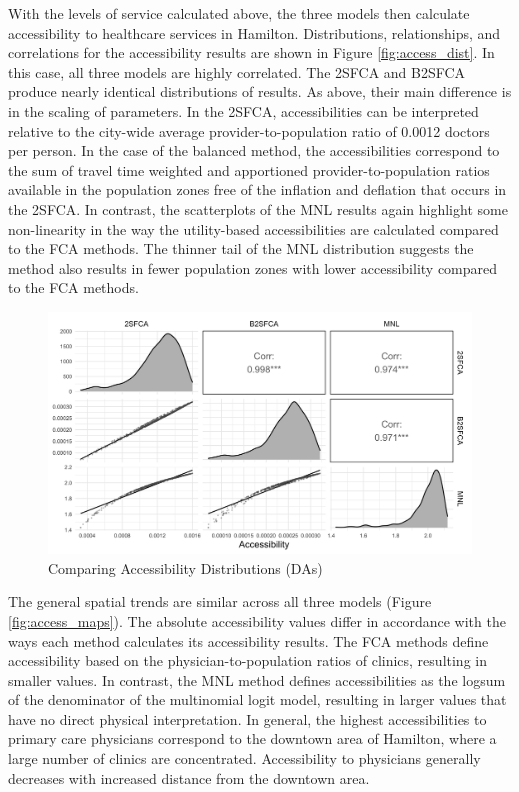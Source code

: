 \documentclass[]{elsarticle} %
\begin{document}
With the levels of service calculated above, the three models then
calculate accessibility to healthcare services in Hamilton.
Distributions, relationships, and correlations for the accessibility
results are shown in Figure \ref{fig:access_dist}. In this case, all
three models are highly correlated. The 2SFCA and B2SFCA produce nearly
identical distributions of results. As above, their main difference is
in the scaling of parameters. In the 2SFCA, accessibilities can be
interpreted relative to the city-wide average provider-to-population
ratio of 0.0012 doctors per person. In the case of the balanced method,
the accessibilities correspond to the sum of travel time weighted and
apportioned provider-to-population ratios available in the population
zones free of the inflation and deflation that occurs in the 2SFCA. In
contrast, the scatterplots of the MNL results again highlight some
non-linearity in the way the utility-based accessibilities are
calculated compared to the FCA methods. The thinner tail of the MNL
distribution suggests the method also results in fewer population zones
with lower accessibility compared to the FCA methods.

\begin{figure}
\includegraphics[width=1\linewidth]{./img/pair_plot_access} \caption{\label{fig:access_dist}Comparing Accessibility Distributions (DAs)}\label{fig:fig 4 access_dist_fig}
\end{figure}

The general spatial trends are similar across all three models (Figure
\ref{fig:access_maps}). The absolute accessibility values differ in
accordance with the ways each method calculates its accessibility
results. The FCA methods define accessibility based on the
physician-to-population ratios of clinics, resulting in smaller values.
In contrast, the MNL method defines accessibilities as the logsum of the
denominator of the multinomial logit model, resulting in larger values
that have no direct physical interpretation. In general, the highest
accessibilities to primary care physicians correspond to the downtown
area of Hamilton, where a large number of clinics are concentrated.
Accessibility to physicians generally decreases with increased distance
from the downtown area.
\end{document}
